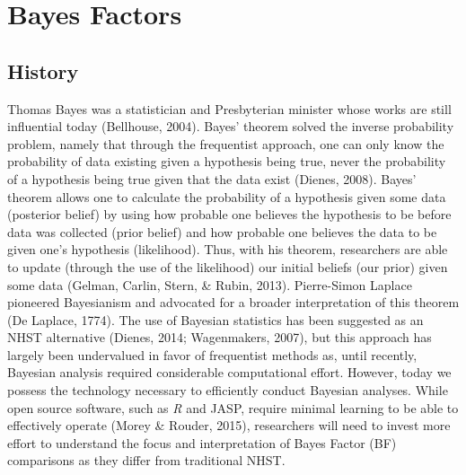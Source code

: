 \documentclass[english,man]{apa6}
\theoremstyle{definition}
\theoremstyle{definition}
\theoremstyle{definition}
\theoremstyle{remark}
\begin{document}
\section{Bayes Factors}\label{bayes-factors}

\subsection{History}\label{history-1}

Thomas Bayes was a statistician and Presbyterian minister whose works
are still influential today (Bellhouse, 2004). Bayes' theorem solved the
inverse probability problem, namely that through the frequentist
approach, one can only know the probability of data existing given a
hypothesis being true, never the probability of a hypothesis being true
given that the data exist (Dienes, 2008). Bayes' theorem allows one to
calculate the probability of a hypothesis given some data (posterior
belief) by using how probable one believes the hypothesis to be before
data was collected (prior belief) and how probable one believes the data
to be given one's hypothesis (likelihood). Thus, with his theorem,
researchers are able to update (through the use of the likelihood) our
initial beliefs (our prior) given some data (Gelman, Carlin, Stern, \&
Rubin, 2013). Pierre-Simon Laplace pioneered Bayesianism and advocated
for a broader interpretation of this theorem (De Laplace, 1774). The use
of Bayesian statistics has been suggested as an NHST alternative
(Dienes, 2014; Wagenmakers, 2007), but this approach has largely been
undervalued in favor of frequentist methods as, until recently, Bayesian
analysis required considerable computational effort. However, today we
possess the technology necessary to efficiently conduct Bayesian
analyses. While open source software, such as \emph{R} and JASP, require
minimal learning to be able to effectively operate (Morey \& Rouder,
2015), researchers will need to invest more effort to understand the
focus and interpretation of Bayes Factor (BF) comparisons as they differ
from traditional NHST.
\end{document}
